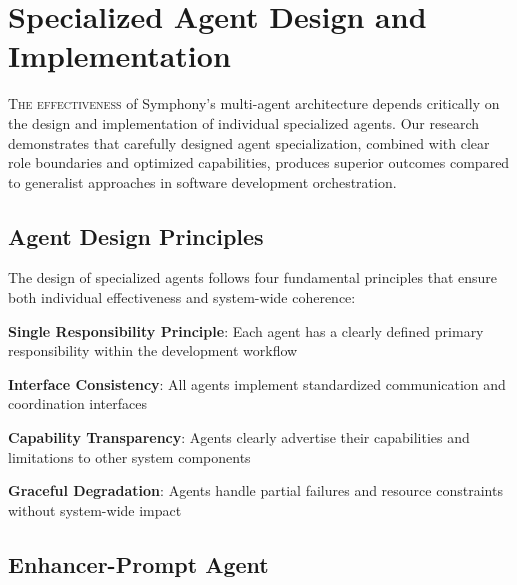 
\section*{Specialized Agent Design and Implementation}

\lettrine{T}{he effectiveness} of Symphony's multi-agent architecture depends critically on the design and implementation of individual specialized agents. Our research demonstrates that carefully designed agent specialization, combined with clear role boundaries and optimized capabilities, produces superior outcomes compared to generalist approaches in software development orchestration.

\subsection*{Agent Design Principles}

The design of specialized agents follows four fundamental principles that ensure both individual effectiveness and system-wide coherence:

\begin{expandedlist}
    \item \textbf{Single Responsibility Principle}: Each agent has a clearly defined primary responsibility within the development workflow
    \item \textbf{Interface Consistency}: All agents implement standardized communication and coordination interfaces
    \item \textbf{Capability Transparency}: Agents clearly advertise their capabilities and limitations to other system components
    \item \textbf{Graceful Degradation}: Agents handle partial failures and resource constraints without system-wide impact
\end{expandedlist}

\subsection*{Enhancer-Prompt Agent}


